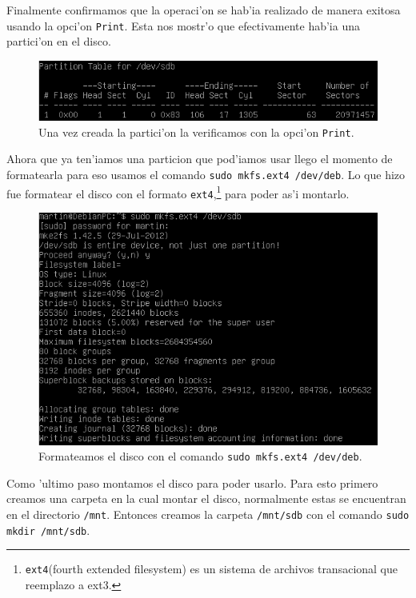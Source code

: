 \documentclass[11pt]{article}
\begin{document}
		Finalmente confirmamos que la operaci'on se hab'ia realizado de manera exitosa usando la opci'on \texttt{Print}. Esta nos mostr'o que efectivamente hab'ia una partici'on en el disco.

		\begin{figure}[H]
    			\centering
    			\includegraphics[scale=0.65]{Images/rsync/rsync_disk_table.PNG}
    			\caption{Una vez creada la partici'on la verificamos con la opci'on \texttt{Print}.}
    			\label{fig:rsync_disk_table}
		\end{figure}

		Ahora que ya ten'iamos una particion que pod'iamos usar llego el momento de formatearla para eso usamos el comando \texttt{sudo mkfs.ext4 /dev/deb}. Lo que hizo fue formatear el disco con el formato \texttt{ext4},\footnote{\texttt{ext4}(fourth extended filesystem) es un sistema de archivos transacional que reemplazo a ext3.} para poder as'i montarlo.
		
 		\begin{figure}[H]
    			\centering
    			\includegraphics[scale=0.65]{Images/rsync/rsync_disk_format.PNG}
    			\caption{Formateamos el disco con el comando \texttt{sudo mkfs.ext4 /dev/deb}.}
    			\label{fig:rsync_disk_format}
		\end{figure}

		Como 'ultimo paso montamos el disco para poder usarlo. Para esto primero creamos una carpeta en la cual montar el disco, normalmente estas se encuentran en el directorio \texttt{/mnt}. Entonces creamos la carpeta \texttt{/mnt/sdb} con el comando \texttt{sudo mkdir /mnt/sdb}.
\end{document}
